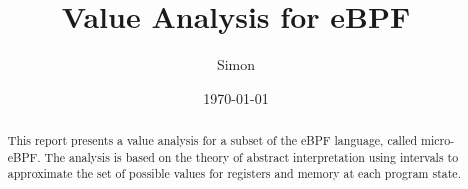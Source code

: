 \documentclass{article}
\title{Value Analysis for eBPF}
\author{Simon}
\date{\today}
\begin{document}
\maketitle

\begin{abstract}
This report presents a value analysis for a subset of the eBPF language, called
micro-eBPF. The analysis is based on the theory of abstract interpretation
using intervals to approximate the set of possible values for registers and
  memory at each program state.
\end{abstract}

\tableofcontents







\end{document}
